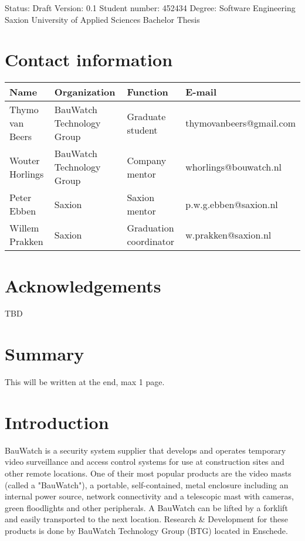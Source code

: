 \begin{titlepage} 
\maketitle
\vspace*{\fill}
Status: Draft
Version: 0.1
Student number: 452434
Degree: Software Engineering
Saxion University of Applied Sciences
Bachelor Thesis
\thispagestyle{empty}
\end{titlepage}
\newpage


\section{Contact information}
\begin{center}
\begin{tabular}{ | m{8em} | m{8em} | m{8em} | m{11.1em} | }
\hline
\textbf{Name} & \textbf{Organization} & \textbf{Function} & \textbf{E-mail}
\\ \hline
Thymo van Beers & BauWatch Technology Group & Graduate student & thymovanbeers@gmail.com
\\ \hline
Wouter Horlings & BauWatch Technology Group & Company mentor & whorlings@bouwatch.nl
\\ \hline
Peter Ebben & Saxion & Saxion mentor & p.w.g.ebben@saxion.nl
\\ \hline
Willem Prakken & Saxion & Graduation coordinator & w.prakken@saxion.nl
\\ \hline
\end{tabular}
\end{center}
\newpage
\section{Acknowledgements}
TBD
\newpage
\section{Summary}
This will be written at the end, max 1 page.
\newpage

\thispagestyle{empty}
\tableofcontents
\thispagestyle{empty}
\newpage

\section{Introduction}
BauWatch is a security system supplier that develops and operates temporary video surveillance and access control systems for use at construction sites and other remote locations.
One of their most popular products are the video masts (called a "BauWatch"), a portable, self-contained, metal enclosure including an internal
power source, network connectivity and a telescopic mast with cameras, green floodlights and other peripherals. A BauWatch can be lifted by a forklift and
easily transported to the next location. Research \& Development for these products is done by BauWatch Technology Group (BTG) located in Enschede.

